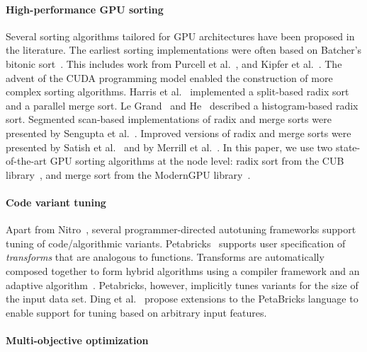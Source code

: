 \paragraph{High-performance GPU sorting}
Several sorting algorithms tailored for GPU architectures have been proposed
in the literature. The earliest sorting implementations were often
based on Batcher's bitonic sort~\cite{batcher:1968}. This includes work from Purcell et al.~\cite{purcell:2003},
and Kipfer et al.~\cite{kipfer:2005}. The advent of the CUDA programming model
enabled the construction of more complex sorting algorithms. Harris et al.~\cite{harris:2007} implemented
a split-based radix sort and a parallel merge sort. Le Grand~\cite{legrand:2007} and He~\cite{he:2007} described a
histogram-based radix sort. Segmented scan-based implementations of radix and merge sorts were
presented by Sengupta et al.~\cite{sengupta:2007}.
Improved versions of radix and merge sorts were presented by Satish et al.~\cite{satish:2009}
and by Merrill et al.~\cite{merrill:2011}.
In this paper, we use two state-of-the-art GPU sorting algorithms at the
node level: radix sort from the CUB library~\cite{cub}, and merge sort from the ModernGPU library~\cite{modernGPU}.

\paragraph{Code variant tuning}
Apart from Nitro~\cite{muralidharan:2014},
several programmer-directed autotuning frameworks support
tuning of code/algorithmic variants.
Petabricks~\cite{PetaBricks} 
supports user specification of \textit{transforms} that
are analogous to functions. Transforms are automatically
composed together to form hybrid algorithms using a compiler
framework and an adaptive algorithm~\cite{increa11}. Petabricks, however,
implicitly tunes variants for the size of the input data set. Ding et
al.~\cite{ding:2015} propose extensions to the PetaBricks language to
enable support for tuning based on arbitrary input features.

\paragraph{Multi-objective optimization}
